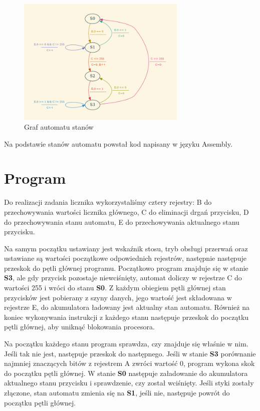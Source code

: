 \documentclass[fleqn]{article}
\begin{document}
\begin{figure}[H]
	\centering
	\includegraphics[width=0.72\textwidth]{img/graph.png}
	\caption{Graf automatu stanów}
	\label{fig:graph}
\end{figure}

\pagebreak

Na podstawie stanów automatu powstał kod napisany w języku Assembly.

\section{Program}
Do realizacji zadania licznika wykorzystaliśmy cztery rejestry: B do przechowywania wartości licznika głównego, C do eliminacji drgań przycisku, D do przechowywania stanu automatu, E do przechowywania aktualnego stanu przycisku.

Na samym początku ustawiany jest wskaźnik stosu, tryb obsługi przerwań oraz ustawiane są wartości początkowe odpowiednich rejestrów, następnie następuje  przeskok do pętli głównej programu. Początkowo program znajduje się w stanie \textbf{S3}, ale gdy przycisk pozostaje niewciśnięty,  automat doliczy w rejestrze C do wartości 255 i wróci do stanu \textbf{S0}. Z każdym obiegiem pętli głównej stan przycisków jest pobierany z szyny danych, jego wartość jest składowana w rejestrze E, do akumulatora ładowany jest aktualny stan automatu. Również na koniec wykonywania instrukcji z każdego stanu następuje przeskok do początku pętli głównej, aby uniknąć blokowania procesora.

Na początku każdego stanu program sprawdza, czy znajduje się właśnie w nim. Jeśli tak nie jest, następuje przeskok do następnego. Jeśli w stanie \textbf{S3} porównanie najmniej znaczących bitów z rejestrem A zwróci wartość 0, program wykona skok do początku pętli głównej. W stanie \textbf{S0} następuje załadowanie do akumulatora aktualnego stanu przycisku i sprawdzenie, czy został wciśnięty. Jeśli styki zostały złączone, stan automatu zmienia się na \textbf{S1}, jeśli nie, następuje powrót do początku pętli głównej.
\end{document}
